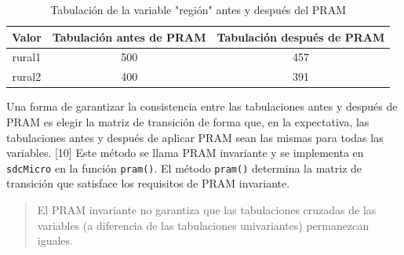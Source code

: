 \documentclass[]{book}
\newenvironment{Shaded}{\begin{snugshade}}{\end{snugshade}}
\newcommand{\CommentTok}[1]{\textcolor[rgb]{0.56,0.35,0.01}{\textit{#1}}}
\newcommand{\DataTypeTok}[1]{\textcolor[rgb]{0.13,0.29,0.53}{#1}}
\newcommand{\KeywordTok}[1]{\textcolor[rgb]{0.13,0.29,0.53}{\textbf{#1}}}
\newcommand{\NormalTok}[1]{#1}
\newcommand{\OperatorTok}[1]{\textcolor[rgb]{0.81,0.36,0.00}{\textbf{#1}}}
\newcommand{\StringTok}[1]{\textcolor[rgb]{0.31,0.60,0.02}{#1}}
\theoremstyle{definition}
\theoremstyle{definition}
\theoremstyle{definition}
\theoremstyle{definition}
\theoremstyle{remark}
\begin{document}
\begin{table}

\caption{\label{tab:Tabla13}\label{tab:Tabla13}Tabulación de la variable "región" antes y después del PRAM}
\centering
\begin{tabular}[t]{ccc}
\toprule
Valor & Tabulación antes de PRAM & Tabulación después de PRAM\\
\midrule
rural1 & 500 & 457\\
rural2 & 400 & 391\\
\bottomrule
\end{tabular}
\end{table}

Una forma de garantizar la consistencia entre las tabulaciones antes y después de PRAM es elegir la matriz de transición de forma que, en la expectativa, las tabulaciones antes y después de aplicar PRAM sean las mismas para todas las variables. {[}10{]} Este método se llama PRAM invariante y se implementa en \texttt{sdcMicro} en la función \texttt{pram()}. El método \texttt{pram()} determina la matriz de transición que satisface los requisitos de PRAM invariante.

\begin{quote}
El PRAM invariante no garantiza que las tabulaciones cruzadas de las variables (a diferencia de las tabulaciones univariantes) permanezcan iguales.
\end{quote}

\begin{Shaded}
\end{Shaded}
\end{document}
